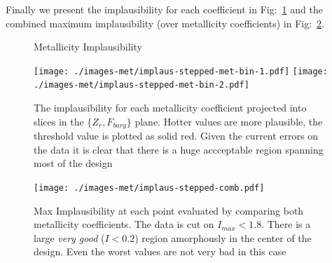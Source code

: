 \documentclass[11pt]{article}
\begin{document}
Finally we present the implausibility for each coefficient in Fig:~\ref{fig-implaus-slices-met} and the combined maximum implausibility (over metallicity coefficients) in Fig:~\ref{fig-implaus-comb-slices-met}.


\begin{figure}
  \begin{center}
    \large{Metallicity Implausibility}
  \end{center}
    \texttt{[image: ./images-met/implaus-stepped-met-bin-1.pdf]} 
    \texttt{[image: ./images-met/implaus-stepped-met-bin-2.pdf]} \\
  \caption{The implausibility for each metallicity coefficient projected into slices in the $\{Z_r,
    F_{bary}\}$ plane. Hotter values are more plausible, the threshold
    value is plotted as solid red. Given the current errors on the data it is clear that there is a huge accceptable region spanning most of the design}
  \label{fig-implaus-slices-met}
\end{figure}


\begin{figure}
  \begin{center}
    \texttt{[image: ./images-met/implaus-stepped-comb.pdf]}
    \caption{Max Implausibility at each point evaluated by comparing
      both metallicity coefficients. The data is cut on $I_{max} <
      1.8$. There is a large \emph{very good} ($I < 0.2$) region amorphously in the center of the design. Even the worst values are not very bad in this case  }
    \label{fig-implaus-comb-slices-met}
    \end{center}
\end{figure}
\end{document}

